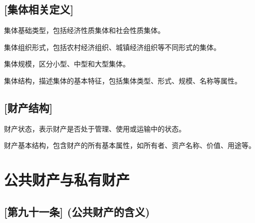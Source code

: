 \subsection{[集体相关定义]}

\begin{definition}\label{CollectiveBaseType}
\leanok
{}
\uses{}
集体基础类型，包括经济性质集体和社会性质集体。
\end{definition}

\begin{definition}\label{CollectiveForm}
\leanok
{}
\uses{}
集体组织形式，包括农村经济组织、城镇经济组织等不同形式的集体。
\end{definition}

\begin{definition}\label{CollectiveScale}
\leanok
{}
\uses{}
集体规模，区分小型、中型和大型集体。
\end{definition}

\begin{definition}\label{Collective}
\leanok
{}
集体结构，描述集体的基本特征，包括集体类型、形式、规模、名称等属性。
\end{definition}

\subsection{[财产结构]}

\begin{definition}\label{PropertyState}
\leanok
{}
\uses{}
财产状态，表示财产是否处于管理、使用或运输中的状态。
\end{definition}

\begin{definition}\label{Property}
\leanok
{}
财产基本结构，包含财产的所有基本属性，如所有者、资产名称、价值、用途等。
\end{definition}

\section{公共财产与私有财产}

\subsection{[第九十一条] (公共财产的含义)}

